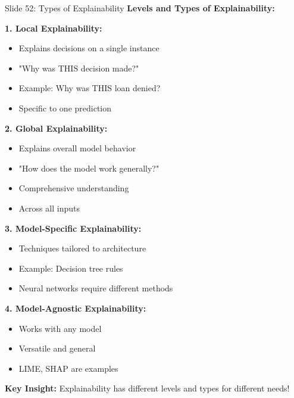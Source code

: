 \documentclass[8pt]{beamer}
\begin{document}
	\begin{frame}{Slide 52: Types of Explainability}
		\fontsize{6.5}{7.5}\selectfont
		\textbf{Levels and Types of Explainability:}
		
		\vspace{0.1cm}
		\textbf{1. Local Explainability:}
		\begin{itemize}
			\item Explains decisions on a single instance
			\item "Why was THIS decision made?"
			\item Example: Why was THIS loan denied?
			\item Specific to one prediction
		\end{itemize}
		
		\vspace{0.1cm}
		\textbf{2. Global Explainability:}
		\begin{itemize}
			\item Explains overall model behavior
			\item "How does the model work generally?"
			\item Comprehensive understanding
			\item Across all inputs
		\end{itemize}
		
		\vspace{0.1cm}
		\textbf{3. Model-Specific Explainability:}
		\begin{itemize}
			\item Techniques tailored to architecture
			\item Example: Decision tree rules
			\item Neural networks require different methods
		\end{itemize}
		
		\vspace{0.1cm}
		\textbf{4. Model-Agnostic Explainability:}
		\begin{itemize}
			\item Works with any model
			\item Versatile and general
			\item LIME, SHAP are examples
		\end{itemize}
		
		\textcolor{myblue}{\textbf{Key Insight:}} Explainability has \textcolor{myblue}{different levels and types} for different needs!
	\end{frame}
	
\end{document}
